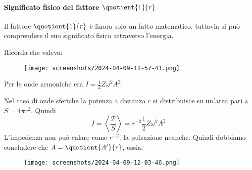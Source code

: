 \paragraph{Significato fisico del fattore \(\quotient{1}{r} \)}
Il fattore \(\quotient{1}{r} \) è finora solo un fatto matematico, tuttavia si può comprendere il suo significato fisico attraverso l'energia.
\begin{note}
	Ricorda che valeva:
	\begin{figure}[H]
		\centering
		\texttt{[image: screenshots/2024-04-09-11-57-41.png]}
	\end{figure}
	Per le onde armoniche era \(I=\frac{1}{2}Z \omega ^{2} A^{2} \).
\end{note}
Nel caso di onde sferiche la potenza a distanza \(r\) si distribuisce su un'area pari a \(S=4\pi r^{2} \). Quindi
\begin{equation}
	I = \left\langle \frac{\mathcal{P} }{S} \right\rangle = r^{-2} \frac{1}{2}Z \omega ^{2} A^{2} 
\end{equation}
L'impedenza non può calare come \(r^{-2}\), la pulsazione neanche. Quindi dobbiamo concludere che \(A=\quotient{A^{\prime} }{r} \), ossia:
\begin{figure}[H]
	\centering
	\texttt{[image: screenshots/2024-04-09-12-03-46.png]}
\end{figure}